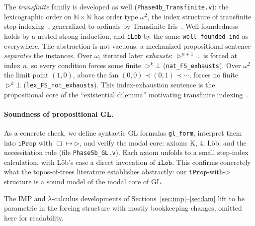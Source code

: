 The \emph{transfinite} family is developed as well
(\texttt{Phase4b\_\allowbreak Transfinite.v}): the lexicographic order on
$\mathbb{N} \times \mathbb{N}$ has order type $\omega^2$, the
index structure of transfinite
step-indexing~\cite{svendsen2016transfinite}, generalized to
ordinals by Transfinite Iris~\cite{spies2021transfinite}.
Well-foundedness holds by a nested strong induction, and \texttt{iLob}
by the same \texttt{well\_founded\_ind} as everywhere.  The abstraction
is not vacuous: a mechanized propositional sentence \emph{separates}
the instances.  Over $\omega$, iterated later \emph{exhausts}:
$\triangleright^{n+1} \bot$ is forced at index $n$, so every
condition forces some finite $\triangleright^k \bot$
(\texttt{nat\_FS\_exhausts}).  Over $\omega^2$ the limit point
$(1,0)$, above the fan $(0,0) \prec (0,1) \prec \cdots$, forces no
finite $\triangleright^k \bot$ (\texttt{lex\_FS\_not\_exhausts}).
This index-exhaustion sentence is the propositional core of the
``existential dilemma'' motivating transfinite
indexing~\cite{spies2021transfinite}.

\paragraph{Soundness of propositional GL.}
As a concrete check, we define syntactic \textsf{GL} formulas
\texttt{gl\_form}, interpret them into $\mathtt{iProp}$ with
$\Box \mapsto \triangleright$, and verify the modal core: axioms K,
4, L\"ob, and the necessitation rule (file \texttt{Phase5b\_GL.v}).
Each axiom unfolds to a small step-index calculation, with L\"ob's
case a direct invocation of $\mathtt{iLob}$.  This confirms concretely
what the topos-of-trees literature establishes abstractly: our
$\mathtt{iProp}$-with-$\triangleright$ structure is a sound model of
the modal core of \textsf{GL}.

The IMP and $\lambda$-calculus developments of
Sections~\ref{sec:imp}--\ref{sec:lam} lift to be parametric in the
forcing structure with mostly bookkeeping changes, omitted here for
readability.

